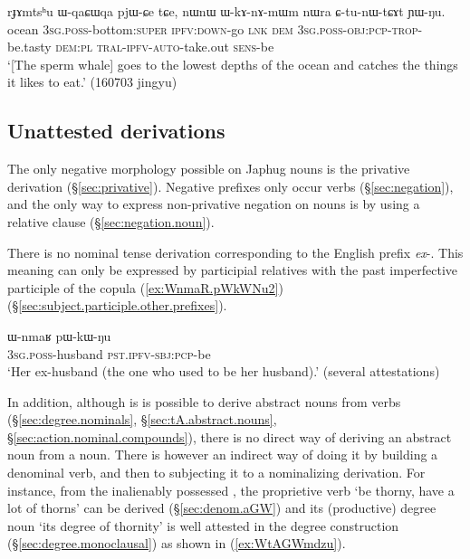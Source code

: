 \largerpage
\begin{exe}
\ex \label{ex:WqaCWqa}
\gll rɟɤmtsʰu ɯ-qaɕɯqa pjɯ-ɕe tɕe, nɯnɯ ɯ-kɤ-nɤ-mɯm nɯra ɕ-tu-nɯ-tɕɤt ɲɯ-ŋu. \\
ocean \textsc{3sg}.\textsc{poss}-bottom:\textsc{super} \textsc{ipfv}:\textsc{down}-go \textsc{lnk} \textsc{dem} \textsc{3sg}.\textsc{poss}-\textsc{obj}:\textsc{pcp}-\textsc{trop}-be.tasty \textsc{dem}:\textsc{pl} \textsc{tral}-\textsc{ipfv}-\textsc{auto}-take.out \textsc{sens}-be \\
\glt `[The sperm whale] goes to the lowest depths of the ocean and catches the things it likes to eat.' (160703 jingyu) 
\end{exe}

\subsection{Unattested derivations} \label{sec:non.existing.derivation}

The only negative morphology possible on Japhug nouns is the privative derivation (§\ref{sec:privative}). Negative prefixes only occur verbs (§\ref{sec:negation}), and the only way to express non-privative negation on nouns is by using a relative clause (§\ref{sec:negation.noun}).

There is no nominal tense derivation corresponding to the English prefix \textit{ex}-. This meaning can only be expressed by participial relatives with the past imperfective participle of the copula  (\ref{ex:WnmaR.pWkWNu2}) (§\ref{sec:subject.participle.other.prefixes}).

\begin{exe}
\ex \label{ex:WnmaR.pWkWNu2}
\gll ɯ-nmaʁ pɯ-kɯ-ŋu \\
\textsc{3sg}.\textsc{poss}-husband \textsc{pst}.\textsc{ipfv}-\textsc{sbj}:\textsc{pcp}-be \\
\glt `Her ex-husband (the one who used to be her husband).' (several attestations)
 \end{exe}
 
In addition, although is is possible to derive abstract nouns from verbs (§\ref{sec:degree.nominals}, §\ref{sec:tA.abstract.nouns}, §\ref{sec:action.nominal.compounds}), there is no direct way of deriving an abstract noun from a noun. There is however an indirect way of doing it by building a denominal verb, and then to subjecting it to a nominalizing derivation. For instance, from the inalienably possessed , the proprietive verb  `be thorny, have a lot of thorns' can be derived (§\ref{sec:denom.aGW}) and its (productive) degree noun  `its degree of thornity' is well attested in the degree construction (§\ref{sec:degree.monoclausal}) as shown in (\ref{ex:WtAGWmdzu}).

